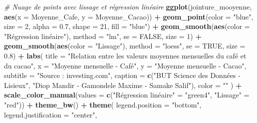 \documentclass[
]{article}
\newenvironment{Shaded}{\begin{snugshade}}{\end{snugshade}}
\newcommand{\AttributeTok}[1]{\textcolor[rgb]{0.13,0.29,0.53}{#1}}
\newcommand{\CommentTok}[1]{\textcolor[rgb]{0.56,0.35,0.01}{\textit{#1}}}
\newcommand{\ConstantTok}[1]{\textcolor[rgb]{0.56,0.35,0.01}{#1}}
\newcommand{\DecValTok}[1]{\textcolor[rgb]{0.00,0.00,0.81}{#1}}
\newcommand{\FloatTok}[1]{\textcolor[rgb]{0.00,0.00,0.81}{#1}}
\newcommand{\FunctionTok}[1]{\textcolor[rgb]{0.13,0.29,0.53}{\textbf{#1}}}
\newcommand{\NormalTok}[1]{#1}
\newcommand{\OtherTok}[1]{\textcolor[rgb]{0.56,0.35,0.01}{#1}}
\newcommand{\SpecialCharTok}[1]{\textcolor[rgb]{0.81,0.36,0.00}{\textbf{#1}}}
\newcommand{\StringTok}[1]{\textcolor[rgb]{0.31,0.60,0.02}{#1}}
\begin{document}
\begin{Shaded}
\begin{Highlighting}[]
\CommentTok{\# Nuage de points avec lissage et régression linéaire}
\FunctionTok{ggplot}\NormalTok{(jointure\_mooyenne, }\FunctionTok{aes}\NormalTok{(}\AttributeTok{x =}\NormalTok{ Moyenne\_Cafe, }\AttributeTok{y =}\NormalTok{ Moyenne\_Cacao)) }\SpecialCharTok{+}
  \FunctionTok{geom\_point}\NormalTok{(}\AttributeTok{color =} \StringTok{"blue"}\NormalTok{, }
             \AttributeTok{size =} \DecValTok{2}\NormalTok{, }
             \AttributeTok{alpha =} \FloatTok{0.7}\NormalTok{, }
             \AttributeTok{shape =} \DecValTok{21}\NormalTok{, }
             \AttributeTok{fill =} \StringTok{"blue"}\NormalTok{) }\SpecialCharTok{+} 
  \FunctionTok{geom\_smooth}\NormalTok{(}\FunctionTok{aes}\NormalTok{(}\AttributeTok{color =} \StringTok{"Régression linéaire"}\NormalTok{), }
              \AttributeTok{method =} \StringTok{"lm"}\NormalTok{, }
              \AttributeTok{se =} \ConstantTok{FALSE}\NormalTok{, }
              \AttributeTok{size =} \DecValTok{1}\NormalTok{) }\SpecialCharTok{+}  
  \FunctionTok{geom\_smooth}\NormalTok{(}\FunctionTok{aes}\NormalTok{(}\AttributeTok{color =} \StringTok{"Lissage"}\NormalTok{), }
              \AttributeTok{method =} \StringTok{"loess"}\NormalTok{, }
              \AttributeTok{se =} \ConstantTok{TRUE}\NormalTok{, }
              \AttributeTok{size =} \FloatTok{0.8}\NormalTok{) }\SpecialCharTok{+}  
  \FunctionTok{labs}\NormalTok{(}
    \AttributeTok{title =} \StringTok{"Relation entre les valeurs moyennes mensuelles du café et du cacao"}\NormalTok{,}
    \AttributeTok{x =} \StringTok{"Moyenne mensuelle {-} Café"}\NormalTok{,}
    \AttributeTok{y =} \StringTok{"Moyenne mensuelle {-} Cacao"}\NormalTok{,}
    \AttributeTok{subtitle =} \StringTok{"Source : investing.com"}\NormalTok{,}
    \AttributeTok{caption =} \FunctionTok{c}\NormalTok{(}\StringTok{"BUT Science des Données {-} Lisieux"}\NormalTok{, }\StringTok{"Diop Mandir {-} Gamondele Maxime {-} Samake Salif"}\NormalTok{),}
    \AttributeTok{color =} \StringTok{""}
\NormalTok{  ) }\SpecialCharTok{+}
  \FunctionTok{scale\_color\_manual}\NormalTok{(}\AttributeTok{values =} \FunctionTok{c}\NormalTok{(}\StringTok{"Régression linéaire"} \OtherTok{=} \StringTok{"green4"}\NormalTok{, }\StringTok{"Lissage"} \OtherTok{=} \StringTok{"red"}\NormalTok{)) }\SpecialCharTok{+} 
  \FunctionTok{theme\_bw}\NormalTok{() }\SpecialCharTok{+}
  \FunctionTok{theme}\NormalTok{(}
    \AttributeTok{legend.position =} \StringTok{"bottom"}\NormalTok{,  }
    \AttributeTok{legend.justification =} \StringTok{"center"}\NormalTok{, }

\end{Highlighting}
\end{Shaded}
\end{document}
